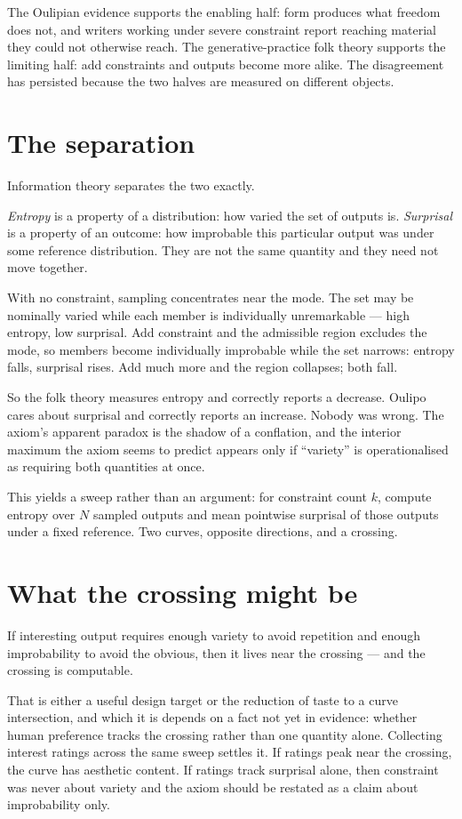 \documentclass[11pt,a4paper]{article}
\begin{document}
The Oulipian evidence supports the enabling half: form produces what freedom does not, and writers working under severe constraint report reaching material they could not otherwise reach. The generative-practice folk theory supports the limiting half: add constraints and outputs become more alike. The disagreement has persisted because the two halves are measured on different objects.

\section{The separation}
Information theory separates the two exactly.

\emph{Entropy} is a property of a distribution: how varied the set of outputs is. \emph{Surprisal} is a property of an outcome: how improbable this particular output was under some reference distribution. They are not the same quantity and they need not move together.

With no constraint, sampling concentrates near the mode. The set may be nominally varied while each member is individually unremarkable --- high entropy, low surprisal. Add constraint and the admissible region excludes the mode, so members become individually improbable while the set narrows: entropy falls, surprisal rises. Add much more and the region collapses; both fall.

So the folk theory measures entropy and correctly reports a decrease. Oulipo cares about surprisal and correctly reports an increase. Nobody was wrong. The axiom's apparent paradox is the shadow of a conflation, and the interior maximum the axiom seems to predict appears only if ``variety'' is operationalised as requiring both quantities at once.

This yields a sweep rather than an argument: for constraint count $k$, compute entropy over $N$ sampled outputs and mean pointwise surprisal of those outputs under a fixed reference. Two curves, opposite directions, and a crossing.

\section{What the crossing might be}
If interesting output requires enough variety to avoid repetition and enough improbability to avoid the obvious, then it lives near the crossing --- and the crossing is computable.

That is either a useful design target or the reduction of taste to a curve intersection, and which it is depends on a fact not yet in evidence: whether human preference tracks the crossing rather than one quantity alone. Collecting interest ratings across the same sweep settles it. If ratings peak near the crossing, the curve has aesthetic content. If ratings track surprisal alone, then constraint was never about variety and the axiom should be restated as a claim about improbability only.
\end{document}
